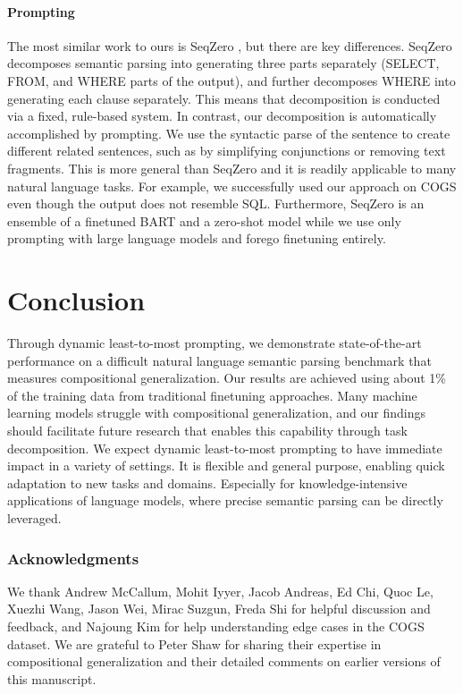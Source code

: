 \documentclass{article} \usepackage{iclr2022_conference,times}
\begin{document}
\paragraph{Prompting} The most similar work to ours is SeqZero \citep{yang-etal-2022-seqzero}, but there are key differences. SeqZero decomposes semantic parsing into generating three parts separately (SELECT, FROM, and WHERE parts of the output), and further decomposes WHERE into generating each clause separately. 
This means that decomposition is conducted via a fixed, rule-based system. In contrast, 
our decomposition is automatically accomplished by prompting. 
We use the syntactic parse of the sentence to create different related sentences, such as by simplifying conjunctions or removing text fragments. This is more general than SeqZero and it is readily applicable to many natural language tasks. For example, we successfully used our approach 
on COGS even though the output does not resemble SQL. Furthermore, SeqZero is an ensemble of a finetuned BART and a zero-shot model while we use only prompting with large language models and forego finetuning entirely.


\section{Conclusion}

Through dynamic least-to-most prompting, we demonstrate state-of-the-art performance on a difficult natural language semantic parsing benchmark that measures compositional generalization. Our results are achieved using about 1\% of the training data from traditional finetuning approaches. Many machine learning models struggle with compositional generalization, and our findings should facilitate future research that enables this capability through task decomposition. We expect dynamic least-to-most prompting to have immediate impact in a variety of settings. It is flexible and general purpose, enabling quick adaptation to new tasks and domains. Especially for knowledge-intensive applications of language models, where precise semantic parsing can be directly leveraged.



\subsubsection*{Acknowledgments}
We thank Andrew McCallum, Mohit Iyyer, Jacob Andreas, Ed Chi, Quoc Le, Xuezhi Wang, Jason Wei, Mirac Suzgun, Freda Shi for helpful discussion and feedback, and
Najoung Kim for help understanding edge cases in the COGS dataset.
We are grateful to Peter Shaw for sharing their expertise in compositional generalization and their detailed comments on earlier versions of this manuscript.
\end{document}
